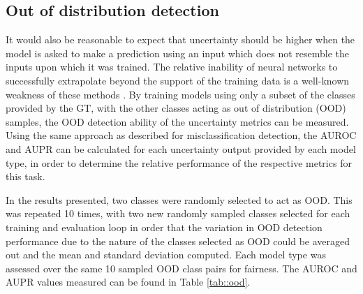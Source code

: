 \documentclass[
twocolumn,
]{ceurart}
\begin{document}
\subsection{Out of distribution detection}

It would also be reasonable to expect that uncertainty should be higher when the model is asked to make a prediction using an input which does not resemble the inputs upon which it was trained.
The relative inability of neural networks to successfully extrapolate beyond the support of the training data is a well-known weakness of these methods \cite{Lakshminarayanan2017}.
By training models using only a subset of the classes provided by the GT, with the other classes acting as out of distribution (OOD) samples, the OOD detection ability of the uncertainty metrics can be measured.
Using the same approach as described for misclassification detection, the AUROC and AUPR can be calculated for each uncertainty output provided by each model type, in order to determine the relative performance of the respective metrics for this task.

In the results presented, two classes were randomly selected to act as OOD.
This was repeated 10 times, with two new randomly sampled classes selected for each training and evaluation loop in order that the variation in OOD detection performance due to the nature of the classes selected as OOD could be averaged out and the mean and standard deviation computed.
Each model type was assessed over the same 10 sampled OOD class pairs for fairness.
The AUROC and AUPR values measured can be found in Table \ref{tab::ood}.
\end{document}
